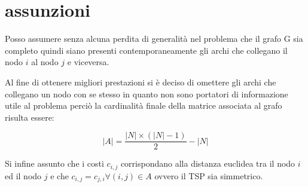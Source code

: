 %
%
\section[Assunzioni]{assunzioni}
\label{pt1:assumption}
Posso assumere senza alcuna perdita di generalità nel problema che il grafo G sia completo quindi siano presenti contemporaneamente gli archi che collegano il nodo $i$ al nodo $j$ e viceversa.

Al fine di ottenere migliori prestazioni si è deciso di omettere gli archi che collegano un nodo con se stesso in quanto non sono portatori di informazione utile al problema perciò la cardinalità finale della matrice associata al grafo risulta essere:

\begin{equation}
\left|A\right| = \frac{\left|N\right|\times\left(\left|N\right|-1\right)}{2} - \left|N\right|
\end{equation}

Si infine assunto che i costi $c_{i,j}$ corrispondano alla distanza euclidea tra il nodo $i$ ed il nodo $j$ e che $c_{i,j}=c_{j,i} \forall (i,j)\in A$ ovvero il TSP sia simmetrico.